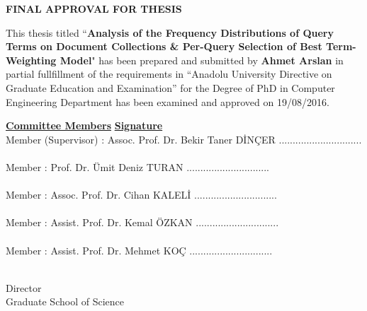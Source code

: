 \newpage
{}
\thispagestyle{empty}
\begin{center}
\textbf{FINAL APPROVAL FOR THESIS}
\end{center}

This thesis titled ``\textbf{Analysis of the Frequency Distributions of Query Terms on Document Collections \& Per-Query Selection of Best Term-Weighting Model}"
has been prepared and submitted by \textbf{Ahmet Arslan} in partial fullfillment of the requirements in ``Anadolu University Directive on Graduate Education and Examination'' for the Degree of PhD in Computer Engineering Department has been examined and approved on 19/08/2016.

\vspace*{4cm} { \noindent
\underline{\textbf{Committee Members}}  \hspace{80mm} \underline{\textbf{Signature}} \\

\noindent
Member (Supervisor) : Assoc. Prof. Dr. Bekir Taner D\.{I}N\c{C}ER     \hfill .............................. \\
\\
Member \hspace{2.23cm} : Prof. Dr. \"{U}mit Deniz TURAN    \hfill .............................. \\
\\
Member \hspace{2.23cm} : Assoc. Prof. Dr. Cihan KALEL\.{I}    \hfill .............................. \\
\\
Member \hspace{2.23cm} : Assist. Prof. Dr. Kemal \"{O}ZKAN    \hfill .............................. \\
\\
Member \hspace{2.23cm} : Assist. Prof. Dr. Mehmet KO\c{C}    \hfill .............................. \\
\\
} \vspace*{3.5cm}

\vspace{-1cm} 


\hspace*{9.9cm} Director \\
\hspace*{9.1cm} Graduate School of Science \\

	